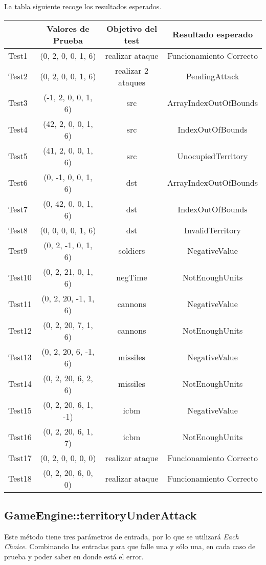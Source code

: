 La tabla siguiente recoge los resultados esperados.

{\footnotesize
\begin{longtable}[c]{lccc}
 & \textbf{Valores de Prueba} & \textbf{Objetivo del test} & \textbf{Resultado esperado} \\
\hline \hline
\endhead

Test1 & (0, 2, 0, 0, 1, 6)  & realizar ataque & Funcionamiento Correcto\\
Test2 & (0, 2, 0, 0, 1, 6)  & realizar 2 ataques & PendingAttack\\
Test3 & (-1, 2, 0, 0, 1, 6)  & src & ArrayIndexOutOfBounds\\
Test4 & (42, 2, 0, 0, 1, 6)  & src & IndexOutOfBounds\\
Test5 & (41, 2, 0, 0, 1, 6)  & src & UnocupiedTerritory\\
Test6 & (0, -1, 0, 0, 1, 6)  & dst  & ArrayIndexOutOfBounds\\
Test7 & (0, 42, 0, 0, 1, 6)  & dst & IndexOutOfBounds\\
Test8 & (0, 0, 0, 0, 1, 6)  & dst & InvalidTerritory\\
Test9 & (0, 2, -1, 0, 1, 6)  & soldiers & NegativeValue\\
Test10 & (0, 2, 21, 0, 1, 6)  & negTime & NotEnoughUnits\\
Test11 & (0, 2, 20, -1, 1, 6)  & cannons & NegativeValue\\
Test12 & (0, 2, 20, 7, 1, 6)  & cannons & NotEnoughUnits\\
Test13 & (0, 2, 20, 6, -1, 6)  & missiles & NegativeValue\\
Test14 & (0, 2, 20, 6, 2, 6)  & missiles & NotEnoughUnits\\
Test15 & (0, 2, 20, 6, 1, -1)  & icbm & NegativeValue\\
Test16 & (0, 2, 20, 6, 1, 7)  & icbm & NotEnoughUnits\\
Test17 & (0, 2, 0, 0, 0, 0)  & realizar ataque & Funcionamiento Correcto\\
Test18 & (0, 2, 20, 6, 0, 0)  & realizar ataque & Funcionamiento Correcto\\

\hline
\end{longtable}
}


\subsection{GameEngine::territoryUnderAttack}

Este método tiene tres parámetros de entrada, por lo que se utilizará \textit{Each Choice}. Combinando las entradas para que falle una y sólo una, en cada caso de prueba y poder saber en donde está el error.

